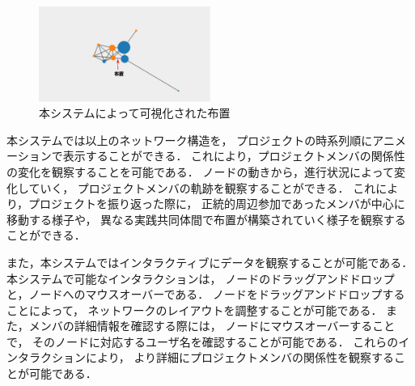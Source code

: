 \begin{figure}[h]
  \centering
  \includegraphics[width=0.5\textwidth]{img/cop-map-overlap.eps}
  \caption{本システムによって可視化された布置}
  \label{cop-map-overlap}
\end{figure}

本システムでは以上のネットワーク構造を，
プロジェクトの時系列順にアニメーションで表示することができる．
これにより，プロジェクトメンバの関係性の変化を観察することを可能である．
ノードの動きから，進行状況によって変化していく，
プロジェクトメンバの軌跡を観察することができる．
これにより，プロジェクトを振り返った際に，
正統的周辺参加であったメンバが中心に移動する様子や，
異なる実践共同体間で布置が構築されていく様子を観察することができる．


また，本システムではインタラクティブにデータを観察することが可能である．
本システムで可能なインタラクションは，
ノードのドラッグアンドドロップと，ノードへのマウスオーバーである．
ノードをドラッグアンドドロップすることによって，
ネットワークのレイアウトを調整することが可能である．
また，メンバの詳細情報を確認する際には，
ノードにマウスオーバーすることで，
そのノードに対応するユーザ名を確認することが可能である．
これらのインタラクションにより，
より詳細にプロジェクトメンバの関係性を観察することが可能である．

